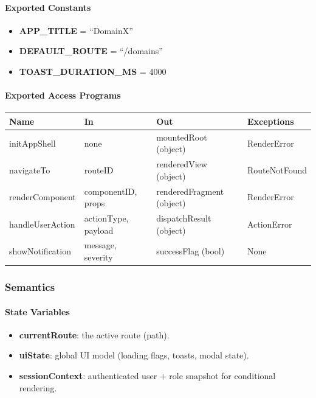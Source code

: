 \documentclass[12pt, titlepage]{article}
\begin{document}
  \paragraph{Exported Constants}
  \begin{itemize}
    \item \textbf{APP\_TITLE} = ``DomainX''
    \item \textbf{DEFAULT\_ROUTE} = ``/domains''
    \item \textbf{TOAST\_DURATION\_MS} = 4000
  \end{itemize}

  \paragraph{Exported Access Programs}
  \begin{center}
  \renewcommand{\arraystretch}{1.2}
  \begin{tabularx}{\textwidth}{l X X l}
  \toprule
  \textbf{Name} & \textbf{In} & \textbf{Out} & \textbf{Exceptions}\\
  \midrule
  initAppShell & none & mountedRoot (object) & RenderError \\
  navigateTo & routeID& renderedView (object) & RouteNotFound \\
  renderComponent & componentID, props & renderedFragment (object) & RenderError \\
  handleUserAction & actionType, payload & dispatchResult (object) & ActionError \\
  showNotification & message, severity & successFlag (bool) & None \\
  \bottomrule
  \end{tabularx}
  \end{center}

  \subsubsection{Semantics}

  \paragraph{State Variables}
  \begin{itemize}
    \item \textbf{currentRoute}: the active route (path).
    \item \textbf{uiState}: global UI model (loading flags, toasts, modal state).
    \item \textbf{sessionContext}: authenticated user + role snapshot for conditional rendering.
  \end{itemize}
\end{document}

